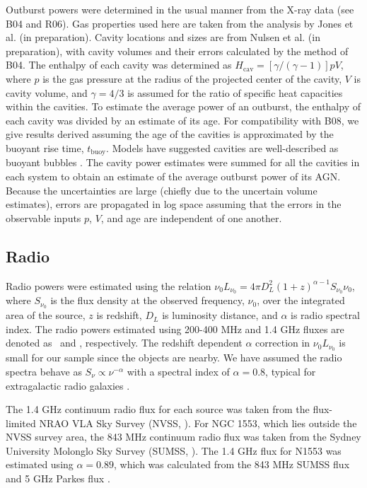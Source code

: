 \documentclass{emulateapj}
\begin{document}
Outburst powers were determined in the usual manner from the X-ray
data (see B04 and R06). Gas properties used here are taken from the
analysis by Jones et al. (in preparation). Cavity locations and sizes
are from Nulsen et al. (in preparation), with cavity volumes and their
errors calculated by the method of B04. The enthalpy of each cavity
was determined as $H_{\mathrm{cav}} = [\gamma/(\gamma-1)] p V$, where
$p$ is the gas pressure at the radius of the projected center of the
cavity, $V$ is cavity volume, and $\gamma = 4/3$ is assumed for the
ratio of specific heat capacities within the cavities. To estimate the
average power of an outburst, the enthalpy of each cavity was divided
by an estimate of its age. For compatibility with B08, we give results
derived assuming the age of the cavities is approximated by the
buoyant rise time, $t_{\mathrm{buoy}}$. Models have suggested cavities
are well-described as buoyant bubbles \citep{2001ApJ...554..261C,
  2003ApJ...592..839B, 2009ApJ...694.1317O}. The cavity power
estimates were summed for all the cavities in each system to obtain an
estimate of the average outburst power of its AGN. Because the
uncertainties are large (chiefly due to the uncertain volume
estimates), errors are propagated in log space assuming that the
errors in the observable inputs $p$, $V$, and age are independent of
one another.

\subsection{Radio}
\label{sec:radio}

Radio powers were estimated using the relation $\nu_0 L_{\nu_0} = 4
\pi D_L^2 (1+z)^{\alpha-1} S_{\nu_0} \nu_0$, where $S_{\nu_0}$ is the
flux density at the observed frequency, $\nu_0$, over the integrated
area of the source, $z$ is redshift, $D_L$ is luminosity distance, and
$\alpha$ is radio spectral index. The radio powers estimated using
200-400 MHz and 1.4 GHz fluxes are denoted as \plow\ and \phigh,
respectively. The redshift dependent $\alpha$ correction in $\nu_0
L_{\nu_0}$ is small for our sample since the objects are nearby. We
have assumed the radio spectra behave as $S_{\nu} \propto
\nu^{-\alpha}$ with a spectral index of $\alpha = 0.8$, typical for
extragalactic radio galaxies \citep{1992ARA&A..30..575C}.

The 1.4 GHz continuum radio flux for each source was taken from the
flux-limited NRAO VLA Sky Survey (NVSS, \citealt{nvss}). For NGC 1553,
which lies outside the NVSS survey area, the 843 MHz continuum radio
flux was taken from the Sydney University Molonglo Sky Survey (SUMSS,
\citealt{sumss1, sumss2}). The 1.4 GHz flux for N1553 was estimated
using $\alpha = 0.89$, which was calculated from the 843 MHz SUMSS
flux and 5 GHz Parkes flux \citep{1970ApL.....5...29W}.
\end{document}
